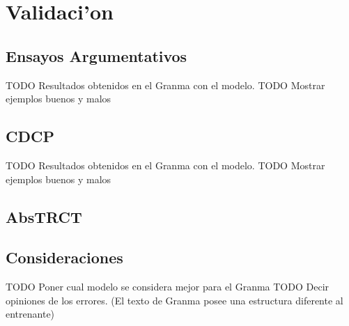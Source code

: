 \section{Validaci'on}

\subsection{Ensayos Argumentativos}

TODO Resultados obtenidos en el Granma con el modelo.
TODO Mostrar ejemplos buenos y malos

\subsection{CDCP}

TODO Resultados obtenidos en el Granma con el modelo.
TODO Mostrar ejemplos buenos y malos

\subsection{AbsTRCT}

\subsection{Consideraciones}

TODO Poner cual modelo se considera mejor para el Granma 
TODO Decir opiniones de los errores. (El texto de Granma posee una estructura diferente al entrenante)
